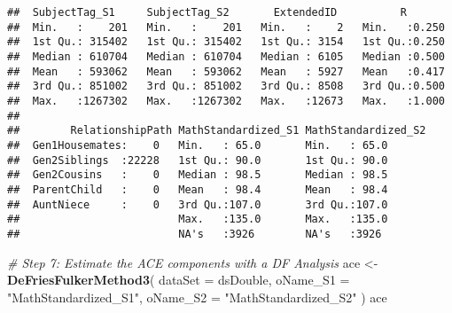 \documentclass[smallextended]{svjour3}       %
\newenvironment{Shaded}{\begin{snugshade}}{\end{snugshade}}
\newcommand{\CommentTok}[1]{\textcolor[rgb]{0.56,0.35,0.01}{\textit{#1}}}
\newcommand{\DataTypeTok}[1]{\textcolor[rgb]{0.13,0.29,0.53}{#1}}
\newcommand{\DecValTok}[1]{\textcolor[rgb]{0.00,0.00,0.81}{#1}}
\newcommand{\KeywordTok}[1]{\textcolor[rgb]{0.13,0.29,0.53}{\textbf{#1}}}
\newcommand{\NormalTok}[1]{#1}
\newcommand{\OperatorTok}[1]{\textcolor[rgb]{0.81,0.36,0.00}{\textbf{#1}}}
\newcommand{\OtherTok}[1]{\textcolor[rgb]{0.56,0.35,0.01}{#1}}
\newcommand{\StringTok}[1]{\textcolor[rgb]{0.31,0.60,0.02}{#1}}
\begin{document}
\begin{Shaded}
\end{Shaded}

\begin{verbatim}
##  SubjectTag_S1     SubjectTag_S2       ExtendedID          R        
##  Min.   :    201   Min.   :    201   Min.   :    2   Min.   :0.250  
##  1st Qu.: 315402   1st Qu.: 315402   1st Qu.: 3154   1st Qu.:0.250  
##  Median : 610704   Median : 610704   Median : 6105   Median :0.500  
##  Mean   : 593062   Mean   : 593062   Mean   : 5927   Mean   :0.417  
##  3rd Qu.: 851002   3rd Qu.: 851002   3rd Qu.: 8508   3rd Qu.:0.500  
##  Max.   :1267302   Max.   :1267302   Max.   :12673   Max.   :1.000  
##                                                                     
##        RelationshipPath MathStandardized_S1 MathStandardized_S2
##  Gen1Housemates:    0   Min.   : 65.0       Min.   : 65.0      
##  Gen2Siblings  :22228   1st Qu.: 90.0       1st Qu.: 90.0      
##  Gen2Cousins   :    0   Median : 98.5       Median : 98.5      
##  ParentChild   :    0   Mean   : 98.4       Mean   : 98.4      
##  AuntNiece     :    0   3rd Qu.:107.0       3rd Qu.:107.0      
##                         Max.   :135.0       Max.   :135.0      
##                         NA's   :3926        NA's   :3926
\end{verbatim}

\begin{Shaded}
\begin{Highlighting}[]
\CommentTok{# Step 7: Estimate the ACE components with a DF Analysis}
\NormalTok{ace <-}\StringTok{ }\KeywordTok{DeFriesFulkerMethod3}\NormalTok{(}
  \DataTypeTok{dataSet  =}\NormalTok{ dsDouble,}
  \DataTypeTok{oName_S1 =} \StringTok{"MathStandardized_S1"}\NormalTok{,}
  \DataTypeTok{oName_S2 =} \StringTok{"MathStandardized_S2"}
\NormalTok{)}
\NormalTok{ace}
\end{Highlighting}
\end{Shaded}
\end{document}
